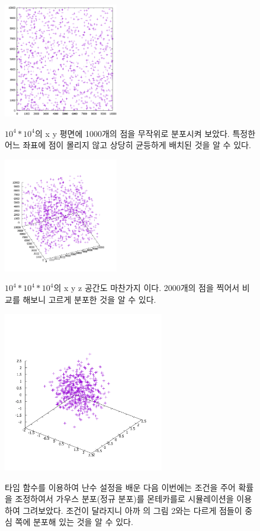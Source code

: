 \documentclass{gshs-report-v1.2}
\begin{document}
\begin{figure}[h]
	\begin{center}
		\includegraphics[width=5cm]{x,y simul2 1000.png}\\
		\caption{$10^4*10^4$의 x y 평면에 1000개의 점을 무작위로 분포시켜 보았다. 특정한 어느 좌표에 점이 몰리지 않고 상당히 균등하게 배치된 것을 알 수 있다.} 
		\label{Fig01}
	\end{center}
\end{figure}
\begin{figure}[h]
	\begin{center}
		\includegraphics[width=5cm]{x,y,z simul.png}\\
		\caption{$10^4*10^4*10^4$의 x y z 공간도 마찬가지 이다. 2000개의 점을 찍어서 비교를 해보니 고르게 분포한 것을 알 수 있다.} 
		\label{Fig02}
	\end{center}
\end{figure}
\begin{figure}[t]
	\begin{center}
		\includegraphics[width=7cm]{gaussian distribution.png}\\
		\caption{타임 함수를 이용하여 난수 설정을 배운 다음 이번에는 조건을 주어 확률을 조정하여서 가우스 분포(정규 분포)를 몬테카를로 시뮬레이션을 이용하여 그려보았다. 조건이 달라지니 아까 의 그림 2와는 다르게 점들이 중심 쪽에 분포해 있는 것을 알 수 있다.} 
		\label{Fig03}
	\end{center}
\end{figure}
\end{document}
